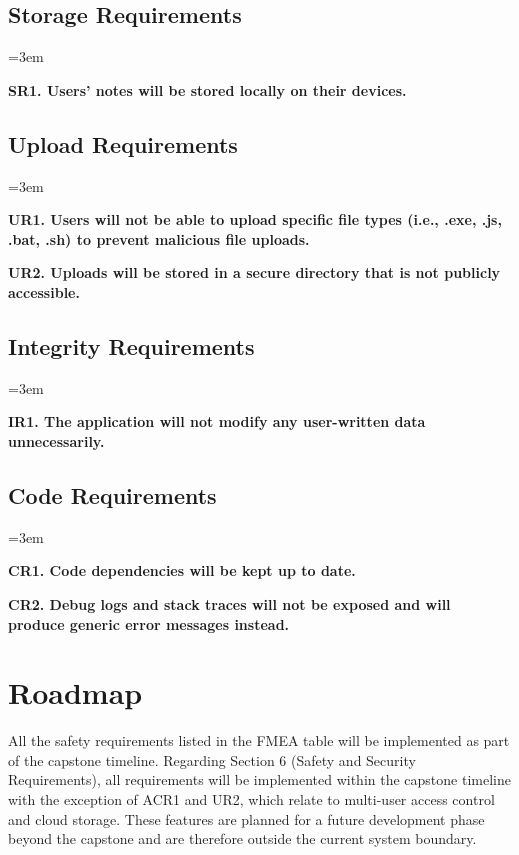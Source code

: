 \documentclass{article}
\begin{document}
\subsection{Storage Requirements}
\begin{list}{}{\leftmargin=3em}
    \item \textbf{SR1. Users' notes will be stored locally on their devices.}
\end{list}

\subsection{Upload Requirements}
\begin{list}{}{\leftmargin=3em}
    \item \textbf{UR1. Users will not be able to upload specific file types (i.e., .exe, .js, .bat, .sh) to prevent malicious file uploads.}
    \item \textbf{UR2. Uploads will be stored in a secure directory that is not publicly accessible.}
\end{list}

\subsection{Integrity Requirements}
\begin{list}{}{\leftmargin=3em}
    \item \textbf{IR1. The application will not modify any user-written data unnecessarily.}
\end{list}

\subsection{Code Requirements}
\begin{list}{}{\leftmargin=3em}
    \item \textbf{CR1. Code dependencies will be kept up to date.}
    \item \textbf{CR2. Debug logs and stack traces will not be exposed and will produce generic error messages instead.}
\end{list}


\section{Roadmap}\label{sec:roadmap}

All the safety requirements listed in the FMEA table will be implemented as part of the capstone timeline. Regarding Section 6 (Safety and Security Requirements), all requirements will be implemented within the capstone timeline with the exception of ACR1 and UR2, which relate to multi-user access control and cloud storage. These features are planned for a future development phase beyond the capstone and are therefore outside the current system boundary.
\end{document}
